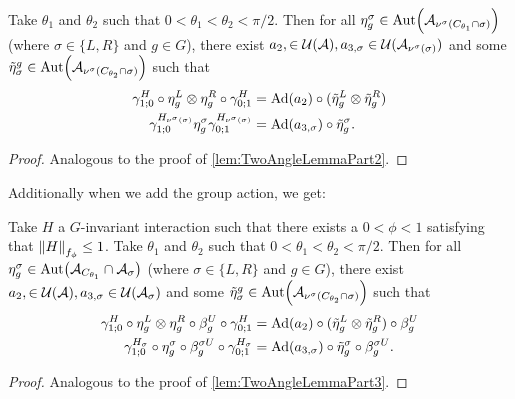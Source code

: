 \documentclass[12pt,a4paper,twoside]{article}
\numberwithin{equation}{section}
\begin{document}
\begin{lemma}\label{lem:TwoAngleLemmaPart2ForTwoTranlations}
	Take $\theta_1$ and $\theta_2$ such that $0<\theta_1<\theta_2<\pi/2$. Then for all $\eta_{g}^{\sigma}\in\Aut{\AA_{\nu^{\sigma}(C_{\theta_1}\cap\sigma)}}$ (where $\sigma\in\{L,R\}$ and $g\in G$), there exist $a_{2},\in\mathcal U(\mathcal A),a_{3,\sigma}\in\mathcal U(\mathcal A_{\nu^{\sigma}(\sigma)})$ and some $\tilde{\eta}_{\sigma}^g\in \Aut{\AA_{\nu^\sigma(C_{\theta_2}\cap\sigma)}}$ such that
	\begin{align}
		\label{eq:TwoAngleLemmaPart2Equation1ForTwoTranlations}
		\gamma^{H}_{1;0}\circ\eta_{g}^L\otimes\eta_{g}^R\circ\gamma^{H}_{0;1}&=\Ad{a_2}\circ(\tilde\eta_{g}^L \otimes\tilde\eta_{g}^R)\\
		\label{eq:TwoAngleLemmaPart2Equation2ForTwoTranlations}
		\gamma^{H_{\nu^{\sigma}(\sigma)}}_{1;0}\eta_g^\sigma\gamma^{H_{\nu^\sigma(\sigma)}}_{0;1}&=\Ad{a_{3,\sigma}}\circ \tilde\eta_{g}^\sigma.
	\end{align}
\end{lemma}
\begin{proof}
	Analogous to the proof of \ref{lem:TwoAngleLemmaPart2}.
\end{proof}
Additionally when we add the group action, we get:
\begin{lemma}\label{lem:TwoAngleLemmaPart3ForTwoTranlations}
	Take $H$ a $G$-invariant interaction such that there exists a $0<\phi<1$ satisfying that $\norm{H}_{f_\phi}\leq 1$. Take $\theta_1$ and $\theta_2$ such that $0<\theta_1<\theta_2<\pi/2$. Then for all $\eta_{g}^{\sigma}\in\Aut{\AA_{C_{\theta_1}}\cap\AA_{\sigma}}$ (where $\sigma\in\{L,R\}$ and $g\in G$), there exist $a_{2},\in\mathcal U(\mathcal A),a_{3,\sigma}\in\mathcal U(\mathcal A_\sigma)$ and some $\tilde{\eta}_{\sigma}^g\in \Aut{\AA_{\nu^\sigma(C_{\theta_2}\cap\sigma)}}$ such that
	\begin{align}
		\label{eq:TwoAngleLemmaPart3Equation1ForTwoTranlations}
		\gamma^{H}_{1;0}\circ\eta_{g}^L\otimes\eta_{g}^R\circ\beta_g^U\circ\gamma^{H}_{0;1}&=\Ad{a_2}\circ(\tilde\eta_{g}^L \otimes\tilde\eta_{g}^R)\circ\beta_g^U\\
		\label{eq:TwoAngleLemmaPart3Equation2ForTwoTranlations}
		\gamma^{H_\sigma}_{1;0}\circ\eta_g^\sigma\circ\beta_g^{\sigma U}\circ\gamma^{H_\sigma}_{0;1}&=\Ad{a_{3,\sigma}}\circ \tilde\eta_{g}^\sigma\circ\beta_g^{\sigma U}.
	\end{align}
\end{lemma}
\begin{proof}
	Analogous to the proof of \ref{lem:TwoAngleLemmaPart3}.
\end{proof}
\end{document}
